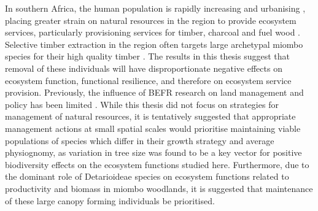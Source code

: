 \begin{refsection}
In southern Africa, the human population is rapidly increasing \citep{} and urbanising \citep{}, placing greater strain on natural resources in the region to provide ecosystem services, particularly provisioning services for timber, charcoal and fuel wood \citep{Ryan2016}. Selective timber extraction in the region often targets large archetypal miombo species for their high quality timber \citep{}. The results in this thesis suggest that removal of these individuals will have disproportionate negative effects on ecosystem function, functional resilience, and therefore on ecosystem service provision. Previously, the influence of BEFR research on land management and policy has been limited \citep{Manning2020}. While this thesis did not focus on strategies for management of natural resources, it is tentatively suggested that appropriate management actions at small spatial scales would prioritise maintaining viable populations of species which differ in their growth strategy and average physiognomy, as variation in tree size was found to be a key vector for positive biodiversity effects on the ecosystem functions studied here. Furthermore, due to the dominant role of Detarioideae species on ecosystem functions related to productivity and biomass in miombo woodlands, it is suggested that maintenance of these large canopy forming individuals be prioritised.


\end{refsection}

